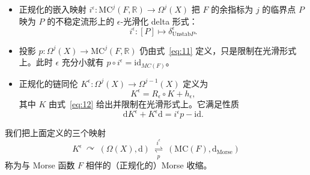 \begin{itemize}
  \item 正规化的嵌入映射 $i^\epsilon\colon \mathrm{MC}^j(F,\mathbb R)\to\Omega^j(X)$ 把 $F$ 的余指标为 $j$ 的临界点 $P$ 映为 $P$ 的不稳定流形上的 $\epsilon$-光滑化 delta 形式：
  \begin{equation}\tag{19}\label{eq:19}
    i^\epsilon\colon[P]\mapsto\delta^\epsilon_{\mathrm{Unstab}P}.
  \end{equation}
  \item 投影 $p\colon\Omega^j(X)\to \mathrm{MC}^j(F,\mathbb R)$ 仍由式~\eqref{eq:11} 定义，只是限制在光滑形式上。此时 $\epsilon$ 充分小就有 $p\circ i^\epsilon=\mathrm{id}_{MC(F)}$。
  \item 正规化的链同伦 $K^\epsilon\colon\Omega^j(X)\to\Omega^{j-1}(X)$ 定义为
  \begin{equation}\tag{20}\label{eq:20}
    K^\epsilon=R_\epsilon\circ K+h_\epsilon,
  \end{equation}
  其中 $K$ 由式~\eqref{eq:12} 给出并限制在光滑形式上。它满足性质
  \begin{equation}\tag{21}\label{eq:21}
    \mathrm{d}K^\epsilon+K^\epsilon\mathrm{d}=i^\epsilon p-\mathrm{id}.
  \end{equation}
\end{itemize}

我们把上面定义的三个映射
\begin{equation}\tag{22}\label{eq:22}
  K^\epsilon\ \curvearrowright\ (\Omega(X),\mathrm{d})
  \ \underset{p}{\overset{i^\epsilon}{\rightleftharpoons}}\
  (\mathrm{MC}(F),\mathrm{d}_{\mathrm{Morse}})
\end{equation}
称为与 Morse 函数 $F$ 相伴的（正规化的）Morse 收缩。


\endinput
